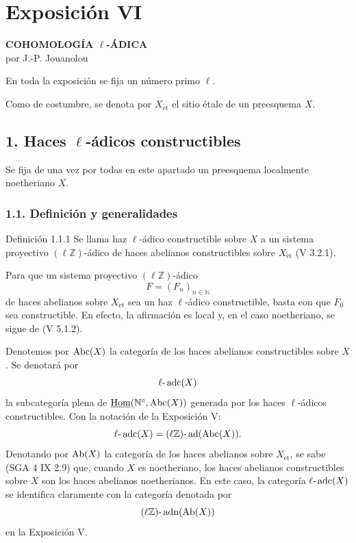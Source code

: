 \section*{Exposición VI}

\begin{center}
\textbf{COHOMOLOGÍA \(\ell\)-ÁDICA}\\[0.5em]
por J.-P. Jouanolou
\end{center}

En toda la exposición se fija un número primo \(\ell\).

Como de costumbre, se denota por \(X_{\mathrm{\acute et}}\) el sitio étale de un preesquema \(X\).

\subsection*{1. Haces \(\ell\)-ádicos constructibles}

Se fija de una vez por todas en este apartado un preesquema localmente noetheriano \(X\).

\subsubsection*{1.1. Definición y generalidades}

\begin{statement}{Definición 1.1.1}
Se llama haz \(\ell\)-ádico constructible sobre \(X\) a un sistema proyectivo \((\ell\mathbb Z)\)-ádico de haces abelianos constructibles sobre \(X_{\mathrm{\acute et}}\) (V 3.2.1).
\end{statement}

Para que un sistema proyectivo \((\ell\mathbb Z)\)-ádico
\[
F=(F_n)_{n\in\mathbb N}
\]
de haces abelianos sobre \(X_{\mathrm{\acute et}}\) sea un haz \(\ell\)-ádico constructible, basta con que \(F_0\) sea constructible. En efecto, la afirmación es local y, en el caso noetheriano, se sigue de (V 5.1.2).

Denotemos por \(\operatorname{Abc}(X)\) la categoría de los haces abelianos constructibles sobre \(X\). Se denotará por
\[
\ell\text{-}\operatorname{adc}(X)
\]
la subcategoría plena de \(\underline{\operatorname{Hom}}(\mathbb N^{\circ},\operatorname{Abc}(X))\) generada por los haces \(\ell\)-ádicos constructibles. Con la notación de la Exposición V:
\[
\ell\text{-}\operatorname{adc}(X)=(\ell\mathbb Z)\text{-}\operatorname{ad}(\operatorname{Abc}(X)).
\]
Denotando por \(\operatorname{Ab}(X)\) la categoría de los haces abelianos sobre \(X_{\mathrm{\acute et}}\), se sabe (SGA 4 IX 2.9) que, cuando \(X\) es noetheriano, los haces abelianos constructibles sobre \(X\) son los haces abelianos noetherianos. En este caso, la categoría \(\ell\text{-}\operatorname{adc}(X)\) se identifica claramente con la categoría denotada por
\[
(\ell\mathbb Z)\text{-}\operatorname{adn}(\operatorname{Ab}(X))
\]
en la Exposición V.

